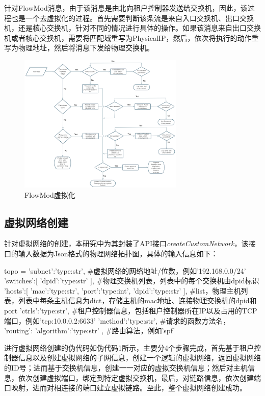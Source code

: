 针对FlowMod消息，由于该消息是由北向租户控制器发送给交换机，因此，该过程也是一个去虚拟化的过程。首先需要判断该条流是来自入口交换机、出口交换机，还是核心交换机，针对不同的情况进行具体的操作。如果该消息来自出口交换机或者核心交换机，需要将匹配域重写为PhysicalIP，然后，依次将执行的动作重写为物理地址，然后将消息下发给物理交换机。

\begin{figure}[!htb]
  \centering
  \includegraphics[width=0.7\textwidth]{logo/FlowMod.png}
  \caption{FlowMod虚拟化}
  \label{fig:flowmod}
\end{figure}
\subsection{虚拟网络创建}
针对虚拟网络的创建，本研究中为其封装了API接口\emph{createCustomNetwork}，该接口的输入数据为Json格式的物理网络拓扑图，具体的输入信息如下：

\begin{python} 
topo = {
	'subnet':'type:str', #虚拟网络的网络地址/位数，例如'192.168.0.0/24'
	'switches':[
		{
			'dpid':'type:str'
		}
	], #物理交换机列表，列表中的每个交换机由dpid标识
	'hosts':[
		{
			'mac':'type:str',
			'port':'type:int',
			'dpid':'type:str'
		}
	], #list，物理主机列表，列表中每条主机信息为dict，存储主机的mac地址、连接物理交换机的dpid和port
	'ctrls':'type:str', #租户控制器信息，包括租户控制器所在IP以及占用的TCP端口，例如'tcp:10.0.0.2:6633'
	'method':'type:str', #请求的函数方法名，
	'routing':{
		'algorithm':'type:str'
	}, #路由算法，例如'spf'
}
\end{python}

进行虚拟网络创建的伪代码如伪代码1所示，主要分4个步骤完成，首先基于租户控制器信息以及创建虚拟网络的子网信息，创建一个逻辑的虚拟网络，返回虚拟网络的ID号；进而基于交换机信息，创建一一对应的虚拟交换机信息；然后对主机信息，依次创建虚拟端口，绑定到特定虚拟交换机，最后，对链路信息，依次创建端口映射，进而对相连接的端口建立虚拟链路。至此，整个虚拟网络创建成功。


